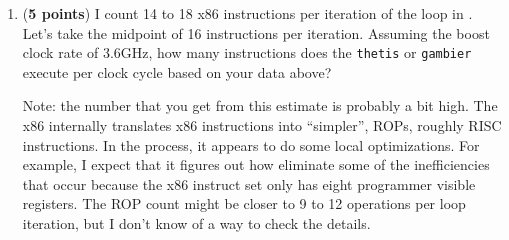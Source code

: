 \documentclass{article}
\newenvironment{answer}
{\par\color{blue}}
{\normalfont\par}
\begin{document}
\begin{enumerate}
\begin{enumerate}
\begin{enumerate}
\begin{answer}
                                  \textbf{Branch mispredict penalty:} $\frac{5297.4 \text{ ns}}{868} \approx \textbf{6.1 nanoseconds}$
                              \end{answer}
                        \item (\textbf{5 points}) The Intel Xeon E5-2698 v3 processors in \texttt{thetis} and \texttt{gambier}
                              have a base CPU clock frequency of 2.3GHz and a boost-clock frequency of 3.6GHz.
                              How many clock-cycles is the branch-mispredict penalty if the CPU is operating at the base clock?
                              How many clock-cycles is the branch-mispredict penalty if the CPU is operating at the boost clock?
                              \par
                              If \texttt{thetis} or \texttt{gambier} is lightly loaded, you should see the boost-clock
                              performance, but I'm not absolutely certain of that.
                              \begin{answer}
                                  base clock: $(\frac{6.1ns}{10^9 ns/s}) \cdot (2.3 \cdot 10^9 cycles / s)$ = 14.03 $\approx$ 14 cycle branch-mispredict penalty \\
                                  boost clock: $(\frac{6.1ns}{10^9 ns/s}) \cdot (3.6 \cdot 10^9 cycles / s)$ = 21.96 $\approx$ 22 cycle branch-mispredict penalty \\
                              \end{answer}
                    \end{enumerate}

              \item (\textbf{5 points})
                    I count 14 to 18 x86 instructions per iteration of the  loop in
                    .  Let's take the midpoint of 16 instructions per iteration.
                    Assuming the boost clock rate of 3.6GHz, how many instructions does the \texttt{thetis}
                    or \texttt{gambier} execute per clock cycle based on your data above?
                    \par
                    Note: the number that you get from this estimate is probably a bit high.
                    The x86 internally translates x86 instructions into ``simpler'', ROPs, roughly RISC instructions.
                    In the process, it appears to do some local optimizations.
                    For example, I expect that it figures out how eliminate some of the inefficiencies that occur
                    because the x86 instruct set only has eight programmer visible registers.
                    The ROP count might be closer to 9 to 12 operations per loop iteration,
                    but I don't know of a way to check the details.


\end{enumerate}
\end{enumerate}
\end{document}
